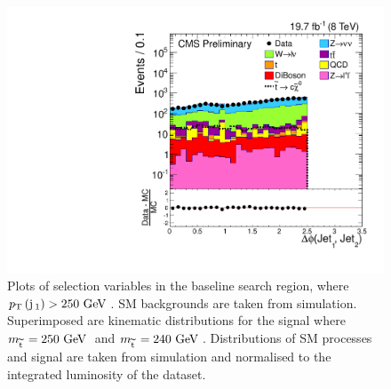 \begin{figure}
\begin{center}
   \includegraphics[scale=0.32]     {Figures/sus13009/cut/dPhi_Jet1_Jet2.pdf}
   \caption{Plots of selection variables in the baseline search region, where $p_{\text{T}}\,({\rm j}\,_1)>250~\mathrm{GeV}\,$. \ac{SM} backgrounds are taken from simulation. Superimposed are kinematic distributions for the signal \ttwocc where $m_{\widetilde{{\rm t}}\,} = 250~\mathrm{GeV}\,$ and $m_{\widetilde{{\rm t}}\,} = 240~\mathrm{GeV}\,$. 
   Distributions of \ac{SM} processes and signal are taken from simulation and normalised to the integrated luminosity of the dataset.
         \label{fig:nplots}}
  \end{center}
\end{figure}




